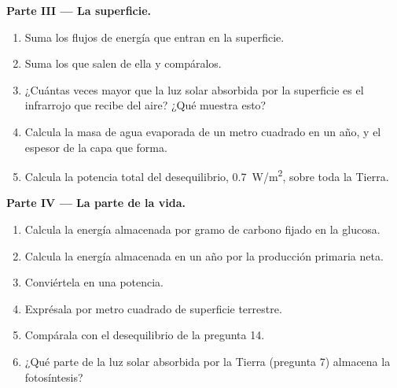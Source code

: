 \begin{problem}
\medskip
\noindent\textbf{Parte III --- La superficie.}
\begin{enumerate}[resume]
  \item Suma los flujos de energía que entran en la superficie.
  \item Suma los que salen de ella y compáralos.
  \item ¿Cuántas veces mayor que la luz solar absorbida por la superficie es
        el infrarrojo que recibe del aire? ¿Qué muestra esto?
  \item Calcula la masa de agua evaporada de un metro cuadrado en un año, y
        el espesor de la capa que forma.
  \item Calcula la potencia total del desequilibrio, \qty{0.7}{W/m^2}, sobre
        toda la Tierra.
\end{enumerate}

\medskip
\noindent\textbf{Parte IV --- La parte de la vida.}
\begin{enumerate}[resume]
  \item Calcula la energía almacenada por gramo de carbono fijado en la
        glucosa.
  \item Calcula la energía almacenada en un año por la producción primaria
        neta.
  \item Conviértela en una potencia.
  \item Exprésala por metro cuadrado de superficie terrestre.
  \item Compárala con el desequilibrio de la pregunta 14.
  \item ¿Qué parte de la luz solar absorbida por la Tierra (pregunta 7)
        almacena la fotosíntesis?
\end{enumerate}
\end{problem}
